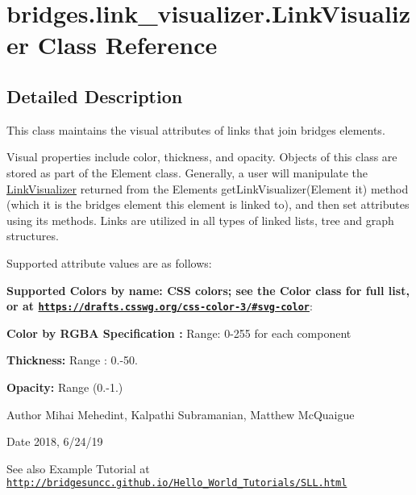 \hypertarget{classbridges_1_1link__visualizer_1_1_link_visualizer}{}\section{bridges.\+link\+\_\+visualizer.\+Link\+Visualizer Class Reference}
\label{classbridges_1_1link__visualizer_1_1_link_visualizer}


\subsection{Detailed Description}
This class maintains the visual attributes of links that join bridges elements. 

Visual properties include color, thickness, and opacity. Objects of this class are stored as part of the Element class. Generally, a user will manipulate the \hyperlink{classbridges_1_1link__visualizer_1_1_link_visualizer}{Link\+Visualizer} returned from the Element\textquotesingle{}s get\+Link\+Visualizer(\+Element it) method (which it is the bridges element this element is linked to), and then set attributes using its methods. Links are utilized in all types of linked lists, tree and graph structures.

Supported attribute values are as follows\+:

{\bfseries Supported Colors by name\+: C\+SS colors; see the Color class for full list, or at \href{https://drafts.csswg.org/css-color-3/#svg-color}{\tt https\+://drafts.\+csswg.\+org/css-\/color-\/3/\#svg-\/color}}\+: 

{\bfseries  Color by R\+G\+BA Specification \+:} Range\+: 0-\/255 for each component 

{\bfseries  Thickness\+: } Range \+: 0.-\/50.

{\bfseries  Opacity\+: } Range (0.-\/1.) 

\begin{DoxyAuthor}{Author}
Mihai Mehedint, Kalpathi Subramanian, Matthew Mc\+Quaigue
\end{DoxyAuthor}
\begin{DoxyDate}{Date}
2018, 6/24/19
\end{DoxyDate}
\begin{DoxySeeAlso}{See also}
Example Tutorial at ~\newline
 \href{http://bridgesuncc.github.io/Hello_World_Tutorials/SLL.html}{\tt http\+://bridgesuncc.\+github.\+io/\+Hello\+\_\+\+World\+\_\+\+Tutorials/\+S\+L\+L.\+html} 
\end{DoxySeeAlso}
